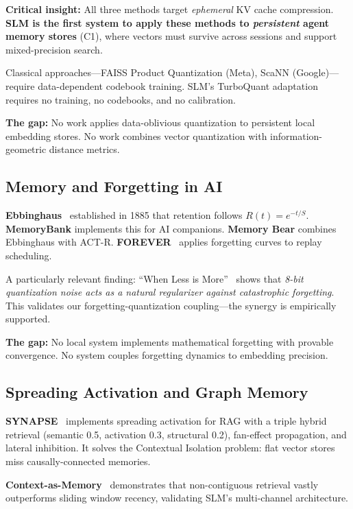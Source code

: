\textbf{Critical insight:} All three methods target \emph{ephemeral} KV cache compression. \textbf{SLM is the first system to apply these methods to \emph{persistent} agent memory stores} (C1), where vectors must survive across sessions and support mixed-precision search.

Classical approaches---FAISS Product Quantization (Meta), ScaNN (Google)---require data-dependent codebook training. SLM's TurboQuant adaptation requires no training, no codebooks, and no calibration.

\textbf{The gap:} No work applies data-oblivious quantization to persistent local embedding stores. No work combines vector quantization with information-geometric distance metrics.

\subsection{Memory and Forgetting in AI}

\textbf{Ebbinghaus}~\cite{ebbinghaus} established in 1885 that retention follows $R(t) = e^{-t/S}$. \textbf{MemoryBank} implements this for AI companions. \textbf{Memory Bear} combines Ebbinghaus with ACT-R. \textbf{FOREVER}~\cite{forever} applies forgetting curves to replay scheduling.

A particularly relevant finding: ``When Less is More''~\cite{when-less-is-more} shows that \emph{8-bit quantization noise acts as a natural regularizer against catastrophic forgetting}. This validates our forgetting-quantization coupling---the synergy is empirically supported.

\textbf{The gap:} No local system implements mathematical forgetting with provable convergence. No system couples forgetting dynamics to embedding precision.

\subsection{Spreading Activation and Graph Memory}

\textbf{SYNAPSE}~\cite{synapse} implements spreading activation for RAG with a triple hybrid retrieval (semantic 0.5, activation 0.3, structural 0.2), fan-effect propagation, and lateral inhibition. It solves the Contextual Isolation problem: flat vector stores miss causally-connected memories.

\textbf{Context-as-Memory}~\cite{context-as-memory} demonstrates that non-contiguous retrieval vastly outperforms sliding window recency, validating SLM's multi-channel architecture.

